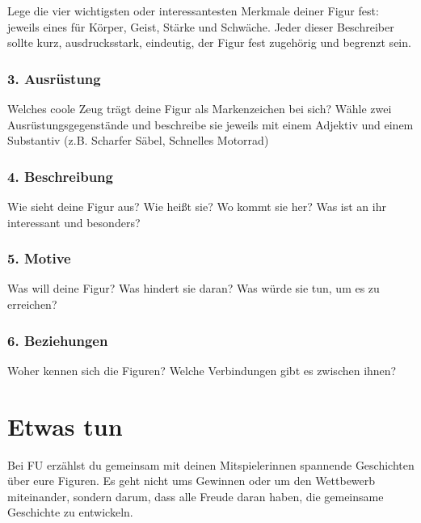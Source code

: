 \documentclass[]{article}
\begin{document}
Lege die vier wichtigsten oder interessantesten Merkmale deiner Figur
fest: jeweils eines für Körper, Geist, Stärke und Schwäche. Jeder dieser
Beschreiber sollte kurz, ausdrucksstark, eindeutig, der Figur fest
zugehörig und begrenzt sein.

\subsubsection*{3. Ausrüstung}\label{ausruxfcstung-1}

Welches coole Zeug trägt deine Figur als Markenzeichen bei sich? Wähle
zwei Ausrüstungsgegenstände und beschreibe sie jeweils mit einem
Adjektiv und einem Substantiv (z.B. Scharfer Säbel, Schnelles Motorrad)

\subsubsection*{4. Beschreibung}\label{beschreibung-1}

Wie sieht deine Figur aus? Wie heißt sie? Wo kommt sie her? Was ist an
ihr interessant und besonders?

\subsubsection*{5. Motive}\label{motive-1}

Was will deine Figur? Was hindert sie daran? Was würde sie tun, um es zu
erreichen?

\subsubsection*{6. Beziehungen}\label{beziehungen-1}

Woher kennen sich die Figuren? Welche Verbindungen gibt es zwischen
ihnen?

\section{Etwas tun}\label{etwas-tun}

Bei FU erzählst du gemeinsam mit deinen Mitspielerinnen spannende
Geschichten über eure Figuren. Es geht nicht ums Gewinnen oder um den
Wettbewerb miteinander, sondern darum, dass alle Freude daran haben, die
gemeinsame Geschichte zu entwickeln.
\end{document}
